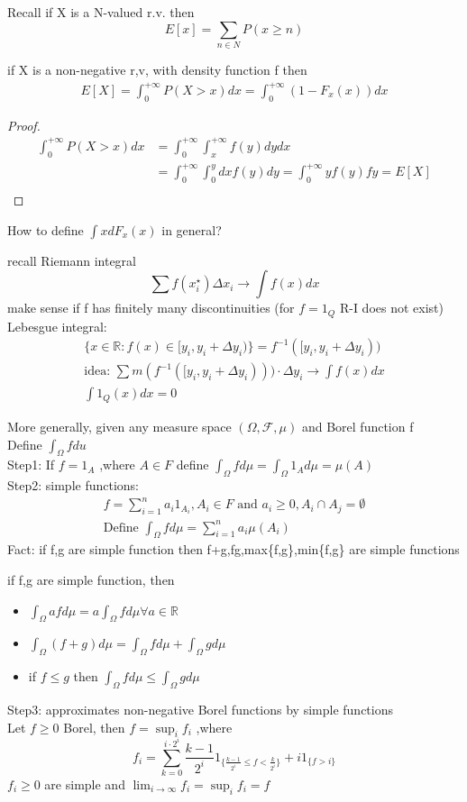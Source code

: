 Recall if X is a N-valued r.v. then $$
    E[x]=\sum_{n\in N}P(x\geq n)
$$ 
\begin{lemma}[]{}
if X is a non-negative r,v, with density function f then\begin{align*}{}{}
E[X]=\int_{0}^{+\infty}P(X> x)dx=\int_{0}^{+\infty}(1-F_x(x))dx
\end{align*}
\end{lemma}
\begin{proof}
    \begin{align*}{}{}
    \int_{0}^{+\infty}P(X>x)dx&=\int_{0}^{+\infty}\int_{x}^{+\infty}f(y)dy dx\\
    &=\int_{0}^{+\infty}\int_{0}^{y}dxf(y)dy=\int_{0}^{+\infty}yf(y)fy=E[X]\\
    \end{align*}
\end{proof}
How to define $ \int xdF_x(x) $ in general?
\begin{definition}{}
recall Riemann integral $$
    \sum f(x_i^\star)\Delta x_i\rightarrow \int f(x)dx
$$ make sense if f has finitely many discontinuities (for $ f=1_Q $ R-I does not exist)
\\Lebesgue integral:\begin{align*}{}{}
\{x\in\mathbb{R}:f(x)\in [y_i,y_i+\Delta y_i)\}=f^{-1}([y_i,y_i+\Delta y_i))\\
\text{idea: }\sum m(f^{-1}([y_i,y_i+\Delta y_i)))\cdot \Delta y_i\rightarrow \int f(x)dx\\
\int 1_Q(x)dx=0
\end{align*}
\end{definition} 
More generally, given any measure space $ (\Omega, \mathcal{F},\mu) $ and Borel function f 
\\Define $ \int_\Omega f du $ 
\\Step1: If $ f=1_A $ ,where $ A\in F $ define $ \int_\Omega f d\mu=\int_\Omega 1_A d\mu=\mu(A) $
\\Step2: simple functions: \begin{align*}{}{}
f=\sum_{i=1}^{n}a_i1_{A_i},A_i\in F \text{ and }a_i\geq0,A_i\cap A_j=\emptyset\\
\text{Define }\int_\Omega f d\mu=\sum_{i=1}^{n}a_i\mu(A_i)
\end{align*}
Fact: if f,g are simple function then f+g,fg,max\{f,g\},min\{f,g\} are simple functions
\begin{proposition}[]{}
if f,g are simple function, then\begin{itemize}
\item $ \int_\Omega af d\mu=a  \int_\Omega f d\mu \forall a\in\mathbb{R}$
\item $ \int_\Omega (f+g)d\mu=\int_\Omega f d\mu+\int_\Omega g d\mu$
\item if $ f\leq g  $ then $ \int_\Omega f d\mu\leq \int_\Omega g d\mu $
\end{itemize}
Step3: approximates non-negative Borel functions by simple functions
\\Let $ f\geq0 $ Borel, then $ f=\sup_if_i  $ ,where$$
    f_i=\sum_{k=0}^{i\cdot 2^i}\frac{k-1}{2^i}1_{\{\frac{k-1}{2^i}\leq f<\frac{k}{2^i}\}}+i1_{\{f>i\}}
$$ $ f_i\geq0 $ are simple and $ \lim_{i\rightarrow\infty}f_i=\sup_if_i =f $ 
\end{proposition}
